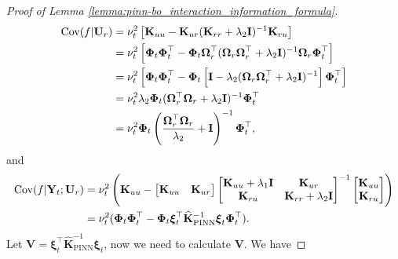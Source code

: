 \begin{proof}[Proof of Lemma \ref{lemma:pinn-bo_interaction_information_formula}]
\begin{align}
    \textup{Cov}(f \rvert \mathbf{U}_r) &=  \nu_t^2 \left[ \mathbf{K}_{uu} - \mathbf{K}_{ur}(\mathbf{K}_{rr}+ \lambda_2\mathbf{I})^{-1} \mathbf{K}_{ru} \right] \nonumber
        \\
        &= \nu_t^2 \left[\boldsymbol{\Phi}_t \boldsymbol{\Phi}_t^\top - \boldsymbol{\Phi}_t\boldsymbol{\Omega}_r^\top (\boldsymbol{\Omega}_r\boldsymbol{\Omega}_r^\top + \lambda_2\mathbf{I})^{-1} \boldsymbol{\Omega}_r\boldsymbol{\Phi}_t^\top \right] \nonumber
        \\
        &= \nu_t^2 \left[\boldsymbol{\Phi}_t\boldsymbol{\Phi}_t^\top - \boldsymbol{\Phi}_t\left[\mathbf{I} - \lambda_2(\boldsymbol{\Omega}_r\boldsymbol{\Omega}_r^\top + \lambda_2\mathbf{I})^{-1}\right] \boldsymbol{\Phi}_t^\top \right] \nonumber
        \\
        &= \nu_t^2 \lambda_2 \boldsymbol{\Phi}_t (\boldsymbol{\Omega}_r^\top \boldsymbol{\Omega}_r + \lambda_2\mathbf{I})^{-1} \boldsymbol{\Phi}_t^\top \nonumber 
        \\ 
        &= \nu_t^2 \boldsymbol{\Phi}_t \left(\frac{\boldsymbol{\Omega}_r^\top \boldsymbol{\Omega}_r}{\lambda_2} + \mathbf{I}\right)^{-1} \boldsymbol{\Phi}_t^\top, \label{Eqn:covar_f_condition_on_u}  
\end{align}
and 
\begin{align}
        \textup{Cov}(f \rvert \mathbf{Y}_t; \mathbf{U}_r) &= \nu_t^2 \left(\mathbf{K}_{uu} - \begin{bmatrix}
            \mathbf{K}_{uu} & \mathbf{K}_{ur}
        \end{bmatrix} \begin{bmatrix}
            \mathbf{K}_{uu} + \lambda_1\mathbf{I} & \mathbf{K}_{ur} \\
            \mathbf{K}_{ru} & \mathbf{K}_{rr} + \lambda_2 \mathbf{I}
        \end{bmatrix}^{-1} \begin{bmatrix}
            \mathbf{K}_{uu} \\
            \mathbf{K}_{ru}
        \end{bmatrix} \right)  \nonumber
        \\
        & = \nu_t^2 (\boldsymbol{\Phi}_t \boldsymbol{\Phi}_t^\top - \boldsymbol{\Phi}_t \boldsymbol{\xi}_t^\top \mathbf{\widehat{K}}_\mathrm{PINN}^{-1} \boldsymbol{\xi}_t \boldsymbol{\Phi}_t^\top).  \label{Eqn:covar_f_condition_on_y_and_u}
\end{align}
Let $\mathbf{V} = \boldsymbol{\xi}_t^\top \mathbf{\widehat{K}}_\mathrm{PINN}^{-1} \boldsymbol{\xi}_t$, now we need to calculate $\mathbf{V}$. We have

\end{proof}
